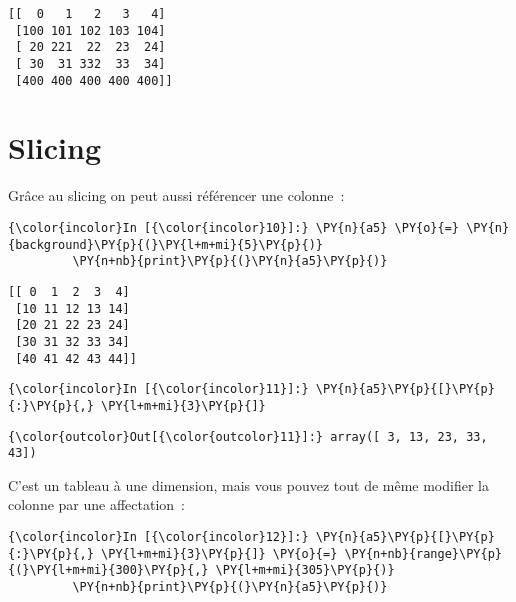     \begin{Verbatim}[commandchars=\\\{\},frame=single,framerule=0.3mm,rulecolor=\color{cellframecolor}]
[[  0   1   2   3   4]
 [100 101 102 103 104]
 [ 20 221  22  23  24]
 [ 30  31 332  33  34]
 [400 400 400 400 400]]
\end{Verbatim}

    \hypertarget{slicing}{%
\section{Slicing}\label{slicing}}

    Grâce au slicing on peut aussi référencer une colonne~:

    \begin{Verbatim}[commandchars=\\\{\},frame=single,framerule=0.3mm,rulecolor=\color{cellframecolor}]
{\color{incolor}In [{\color{incolor}10}]:} \PY{n}{a5} \PY{o}{=} \PY{n}{background}\PY{p}{(}\PY{l+m+mi}{5}\PY{p}{)}
         \PY{n+nb}{print}\PY{p}{(}\PY{n}{a5}\PY{p}{)}
\end{Verbatim}


    \begin{Verbatim}[commandchars=\\\{\},frame=single,framerule=0.3mm,rulecolor=\color{cellframecolor}]
[[ 0  1  2  3  4]
 [10 11 12 13 14]
 [20 21 22 23 24]
 [30 31 32 33 34]
 [40 41 42 43 44]]
\end{Verbatim}

    \begin{Verbatim}[commandchars=\\\{\},frame=single,framerule=0.3mm,rulecolor=\color{cellframecolor}]
{\color{incolor}In [{\color{incolor}11}]:} \PY{n}{a5}\PY{p}{[}\PY{p}{:}\PY{p}{,} \PY{l+m+mi}{3}\PY{p}{]}
\end{Verbatim}


\begin{Verbatim}[commandchars=\\\{\},frame=single,framerule=0.3mm,rulecolor=\color{cellframecolor}]
{\color{outcolor}Out[{\color{outcolor}11}]:} array([ 3, 13, 23, 33, 43])
\end{Verbatim}
            
    C'est un tableau à une dimension, mais vous pouvez tout de même modifier
la colonne par une affectation~:

    \begin{Verbatim}[commandchars=\\\{\},frame=single,framerule=0.3mm,rulecolor=\color{cellframecolor}]
{\color{incolor}In [{\color{incolor}12}]:} \PY{n}{a5}\PY{p}{[}\PY{p}{:}\PY{p}{,} \PY{l+m+mi}{3}\PY{p}{]} \PY{o}{=} \PY{n+nb}{range}\PY{p}{(}\PY{l+m+mi}{300}\PY{p}{,} \PY{l+m+mi}{305}\PY{p}{)}
         \PY{n+nb}{print}\PY{p}{(}\PY{n}{a5}\PY{p}{)}
\end{Verbatim}



